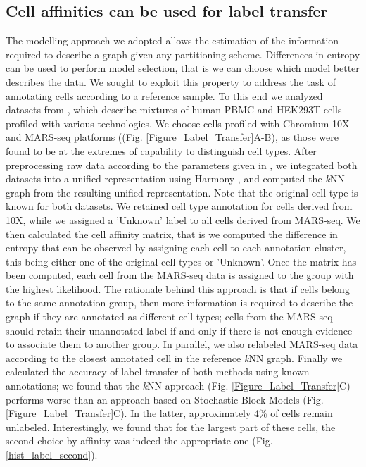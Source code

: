 \documentclass[10pt]{article}
\begin{document}
\subsection*{Cell affinities can be used for label transfer}

The modelling approach we adopted allows the estimation of the information required to describe a graph given any partitioning scheme. Differences in entropy can be used to perform model selection, that is we can choose which model better describes the data. We sought to exploit this property to address the task of annotating cells according to a reference sample. To this end we analyzed datasets from \cite{mereu_2020}, which describe mixtures of human PBMC and HEK293T cells profiled with various technologies. We choose cells profiled with Chromium 10X and MARS-seq platforms ((Fig. \ref{Figure_Label_Transfer}A-B), as those were found to be at the extremes of capability to distinguish cell types. After preprocessing raw data according to the parameters given in \cite{mereu_2020}, we integrated both datasets into a unified representation using Harmony \cite{Korsunsky_2019}, and computed the \emph{k}NN graph from the resulting unified representation. Note that the original cell type is known for both datasets. We retained cell type annotation for cells derived from 10X, while we assigned a 'Unknown' label to all cells derived from MARS-seq. We then calculated the cell affinity matrix, that is we computed the difference in entropy that can be observed by assigning each cell to each annotation cluster, this being either one of the original cell types or 'Unknown'. Once the matrix has been computed, each cell from the MARS-seq data is assigned to the group with the highest likelihood. The rationale behind this approach is that if cells belong to the same annotation group, then more information is required to describe the graph if they are annotated as different cell types; cells from the MARS-seq should retain their unannotated label if and only if there is not enough evidence to associate them to another group. In parallel, we also relabeled MARS-seq data according to the closest annotated cell in the reference \emph{k}NN graph. Finally we calculated the accuracy of label transfer of both methods using known annotations; we found that the \emph{k}NN approach (Fig. \ref{Figure_Label_Transfer}C) performs worse than an approach based on Stochastic Block Models (Fig. \ref{Figure_Label_Transfer}C). In the latter, approximately 4\% of cells remain unlabeled. Interestingly, we found that for the largest part of these cells, the second choice by affinity was indeed the appropriate one (Fig. \ref{hist_label_second}).
\end{document}
